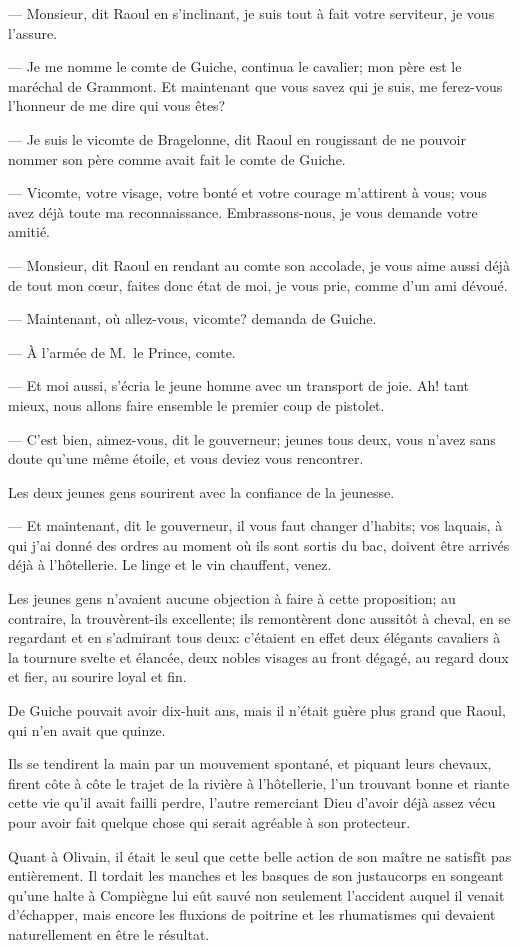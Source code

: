 — Monsieur, dit Raoul en s'inclinant, je suis tout à fait votre serviteur, je vous l'assure.

— Je me nomme le comte de Guiche, continua le cavalier; mon père est le maréchal de Grammont. Et maintenant que vous savez qui je suis, me ferez-vous l'honneur de me dire qui vous êtes?

— Je suis le vicomte de Bragelonne, dit Raoul en rougissant de ne pouvoir nommer son père comme avait fait le comte de Guiche.

— Vicomte, votre visage, votre bonté et votre courage m'attirent à vous; vous avez déjà toute ma reconnaissance. Embrassons-nous, je vous demande votre amitié.

— Monsieur, dit Raoul en rendant au comte son accolade, je vous aime aussi déjà de tout mon cœur, faites donc état de moi, je vous prie, comme d'un ami dévoué.

— Maintenant, où allez-vous, vicomte? demanda de Guiche.

— À l'armée de M.~le Prince, comte.

— Et moi aussi, s'écria le jeune homme avec un transport de joie. Ah! tant mieux, nous allons faire ensemble le premier coup de pistolet.

— C'est bien, aimez-vous, dit le gouverneur; jeunes tous deux, vous n'avez sans doute qu'une même étoile, et vous deviez vous rencontrer.

Les deux jeunes gens sourirent avec la confiance de la jeunesse.

— Et maintenant, dit le gouverneur, il vous faut changer d'habits; vos laquais, à qui j'ai donné des ordres au moment où ils sont sortis du bac, doivent être arrivés déjà à l'hôtellerie. Le linge et le vin chauffent, venez.

Les jeunes gens n'avaient aucune objection à faire à cette proposition; au contraire, la trouvèrent-ils excellente; ils remontèrent donc aussitôt à cheval, en se regardant et en s'admirant tous deux: c'étaient en effet deux élégants cavaliers à la tournure svelte et élancée, deux nobles visages au front dégagé, au regard doux et fier, au sourire loyal et fin.

De Guiche pouvait avoir dix-huit ans, mais il n'était guère plus grand que Raoul, qui n'en avait que quinze.

Ils se tendirent la main par un mouvement spontané, et piquant leurs chevaux, firent côte à côte le trajet de la rivière à l'hôtellerie, l'un trouvant bonne et riante cette vie qu'il avait failli perdre, l'autre remerciant Dieu d'avoir déjà assez vécu pour avoir fait quelque chose qui serait agréable à son protecteur.

Quant à Olivain, il était le seul que cette belle action de son maître ne satisfît pas entièrement. Il tordait les manches et les basques de son justaucorps en songeant qu'une halte à Compiègne lui eût sauvé non seulement l'accident auquel il venait d'échapper, mais encore les fluxions de poitrine et les rhumatismes qui devaient naturellement en être le résultat.